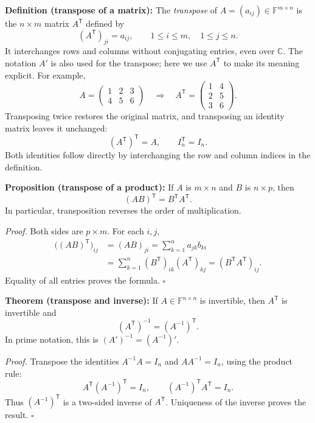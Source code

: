 \documentclass[a4paper,11pt,abstract=true]{scrartcl}
\theoremstyle{dotlessP}
\theoremstyle{dotlessS}
\theoremstyle{remark}
\theoremstyle{definition}
\begin{document}
\begin{definition_box}
\textbf{Definition (transpose of a matrix):} The
\emph{transpose} of $A=(a_{ij})\in\mathbb{F}^{m\times n}$ is the
$n\times m$ matrix $A^{\mathsf{T}}$ defined by
\[
{(A^{\mathsf{T}})}_{ji}=a_{ij},
\qquad 1\leq i\leq m,\quad 1\leq j\leq n.
\]
It interchanges rows and columns without conjugating entries, even
over $\mathbb{C}$. The notation $A'$ is also used for the transpose;
here we use $A^{\mathsf{T}}$ to make its meaning explicit. For example,
\[
A=\begin{pmatrix}1&2&3\\4&5&6\end{pmatrix}
\quad\Longrightarrow\quad
A^{\mathsf{T}}=\begin{pmatrix}1&4\\2&5\\3&6\end{pmatrix}.
\]
Transposing twice restores the original matrix, and transposing an
identity matrix leaves it unchanged:
\[
{(A^{\mathsf{T}})}^{\mathsf{T}}=A,\qquad I_n^{\mathsf{T}}=I_n.
\]
Both identities follow directly by interchanging the row and column
indices in the definition.
\end{definition_box}

\begin{claim_box}
\textbf{Proposition (transpose of a product):} If $A$ is
$m\times n$ and $B$ is $n\times p$, then
\[
{(AB)}^{\mathsf{T}}=B^{\mathsf{T}}A^{\mathsf{T}}.
\]
In particular, transposition reverses the order of multiplication.

\textit{Proof.} Both sides are $p\times m$. For each $i,j$,
\[
\begin{aligned}
{\bigl({(AB)}^{\mathsf{T}}\bigr)}_{ij}
&={(AB)}_{ji}=\sum_{k=1}^n a_{jk}b_{ki}\\
&=\sum_{k=1}^n {(B^{\mathsf{T}})}_{ik}{(A^{\mathsf{T}})}_{kj}
={(B^{\mathsf{T}}A^{\mathsf{T}})}_{ij}.
\end{aligned}
\]
Equality of all entries proves the formula. \hfill$\square$
\end{claim_box}

\begin{claim_box}
\textbf{Theorem (transpose and inverse):} If
$A\in\mathbb{F}^{n\times n}$ is invertible, then $A^{\mathsf{T}}$
is invertible and
\[
\boxed{{(A^{\mathsf{T}})}^{-1}={(A^{-1})}^{\mathsf{T}}.}
\]
In prime notation, this is ${(A')}^{-1}={(A^{-1})}'$.

\textit{Proof.} Transpose the identities $A^{-1}A=I_n$ and
$AA^{-1}=I_n$, using the product rule:
\[
A^{\mathsf{T}}{(A^{-1})}^{\mathsf{T}}=I_n,\qquad
{(A^{-1})}^{\mathsf{T}}A^{\mathsf{T}}=I_n.
\]
Thus ${(A^{-1})}^{\mathsf{T}}$ is a two-sided inverse of
$A^{\mathsf{T}}$. Uniqueness of the inverse proves the result.
\hfill$\square$
\end{claim_box}
\end{document}
